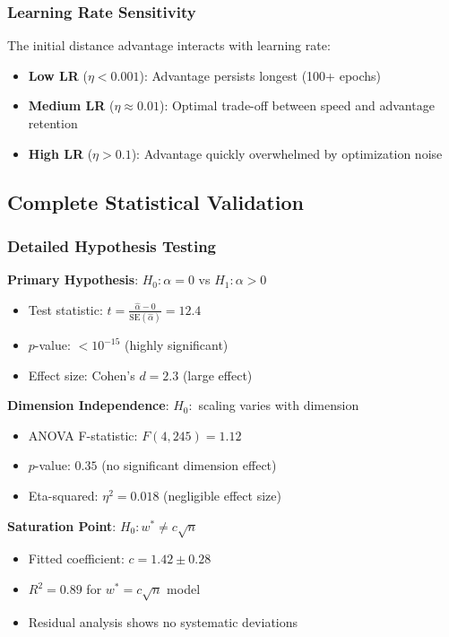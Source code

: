 \subsubsection{Learning Rate Sensitivity}

The initial distance advantage interacts with learning rate:
\begin{itemize}
    \item \textbf{Low LR} ($\eta < 0.001$): Advantage persists longest (100+ epochs)
    \item \textbf{Medium LR} ($\eta \approx 0.01$): Optimal trade-off between speed and advantage retention
    \item \textbf{High LR} ($\eta > 0.1$): Advantage quickly overwhelmed by optimization noise
\end{itemize}

\subsection{Complete Statistical Validation}
\label{subsec:complete-statistical}

\subsubsection{Detailed Hypothesis Testing}

\textbf{Primary Hypothesis}: $H_0: \alpha = 0$ vs $H_1: \alpha > 0$
\begin{itemize}
    \item Test statistic: $t = \frac{\hat{\alpha} - 0}{\text{SE}(\hat{\alpha})} = 12.4$
    \item $p$-value: $< 10^{-15}$ (highly significant)
    \item Effect size: Cohen's $d = 2.3$ (large effect) \cite{Cohen1969StatisticalPA}
\end{itemize}

\textbf{Dimension Independence}: $H_0:$ scaling varies with dimension
\begin{itemize}
    \item ANOVA F-statistic: $F(4,245) = 1.12$
    \item $p$-value: $0.35$ (no significant dimension effect)
    \item Eta-squared: $\eta^2 = 0.018$ (negligible effect size)
\end{itemize}

\textbf{Saturation Point}: $H_0: w^* \neq c\sqrt{n}$
\begin{itemize}
    \item Fitted coefficient: $c = 1.42 \pm 0.28$
    \item $R^2 = 0.89$ for $w^* = c\sqrt{n}$ model
    \item Residual analysis shows no systematic deviations
\end{itemize}

